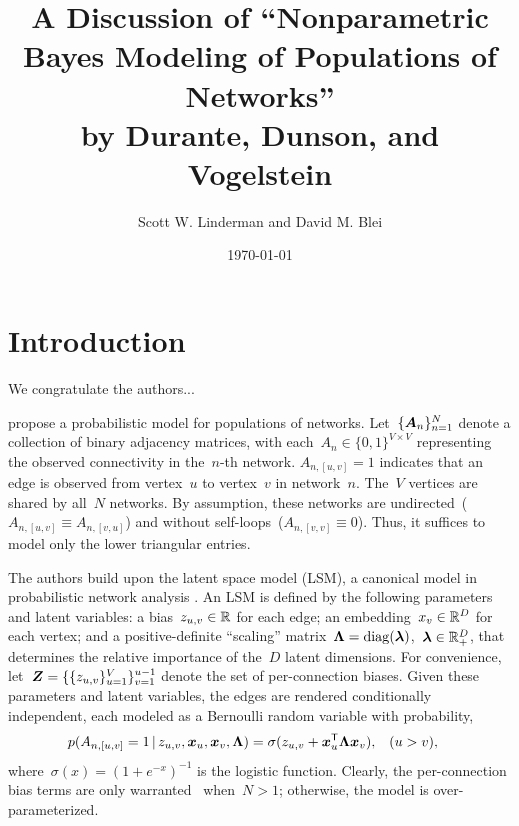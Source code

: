 



\title{A Discussion of ``Nonparametric Bayes Modeling of Populations of Networks''\\
by Durante, Dunson, and Vogelstein}
\author{Scott W. Linderman and David M. Blei}
\date{\today}


\maketitle

\begin{abstract}

\end{abstract}

\section{Introduction}

We congratulate the authors...

\citet{durante2016nonparametric} propose a probabilistic model for
populations of networks.  Let~$\{\boldsymbol{A}_n\}_{n=1}^N$ denote a collection
of binary adjacency matrices, with
each~${A_n \in \{0,1\}^{V \times V}}$ representing the observed
connectivity in the~$n$-th network.  ${A_{n,[u,v]}=1}$ indicates that
an edge is observed from vertex~$u$ to vertex~$v$ in
network~$n$.
The~$V$ vertices are shared by all~$N$ networks.
By assumption, these networks are undirected~(${A_{n,[u,v]} \equiv A_{n,[v,u]}}$)
and without self-loops~(${A_{n,[v,v]} \equiv 0}$). Thus, it suffices to model only
the lower triangular entries.

The authors build upon the latent space model (LSM), a canonical model
in probabilistic network analysis \citep{hoff2002latent,
  hoff2008modeling}. An LSM is defined by the following parameters and
latent variables: a bias~${z_{u,v} \in \mathbb{R}}$ for each edge; an
embedding~${x_v \in \mathbb{R}^D}$ for each vertex; and a
positive-definite ``scaling''
matrix~${\boldsymbol{\Lambda} = \operatorname{diag}(\boldsymbol{\lambda})}$,~$\boldsymbol{\lambda} \in \mathbb{R}_+^D$, that
determines the relative importance of the~$D$ latent dimensions.  For
convenience, let~${\boldsymbol{Z} = \{\{z_{u,v}\}_{u=1}^V\}_{v=1}^{u-1}}$ denote
the set of per-connection biases.  Given these parameters and latent
variables, the edges are rendered conditionally independent, each
modeled as a Bernoulli random variable with probability,
\begin{align}
  p(A_{n,[u,v]}=1 \, | \, z_{u,v}, \boldsymbol{x}_u, \boldsymbol{x}_v, \boldsymbol{\Lambda})
  &= \sigma(z_{u,v} + \boldsymbol{x}_u^{\mathsf{T}} \boldsymbol{\Lambda} \boldsymbol{x}_v),
  & (u &> v),
\end{align}
where~${\sigma(x) = (1+e^{-x})^{-1}}$ is the logistic function.
Clearly, the per-connection bias terms are only warranted
~when~${N > 1}$; otherwise, the model is over-parameterized.

